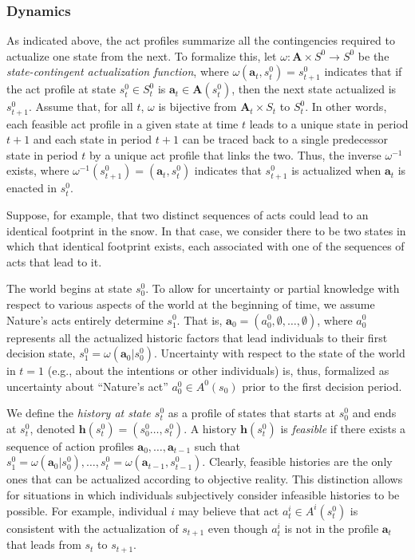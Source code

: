 \documentclass[
11pt,
titlepage,
reqno,
]{article}%
\theoremstyle{definition}
\begin{document}
	

	\subsubsection{Dynamics  } 
	  
	As indicated above, the act profiles summarize all the contingencies required to actualize one state from the next. 
	To formalize this, let $\omega:\mathbf{A}\times S^0\rightarrow S^0$ be the \textit{state-contingent actualization function}, where $\omega(\mathbf{a}_t,s^0_t)=s^0_{t+1}$ indicates that if the act profile at state $s^0_t\in S^0_t$ is $\mathbf{a}_t\in \mathbf{A}(s^0_t)$, then the next state actualized is $s^0_{t+1}$.
	Assume that, for all $t$, $\omega$ is bijective from $\mathbf{A}_t\times S_t$ to $S^0_t$.
	In other words, each feasible  act profile in a given state at time $t$ leads to a unique state in period $t+1$ and each state in period $t+1$ can be traced back to a single predecessor state in period $t$ by a unique act profile that links the two.
	Thus, the inverse $\omega^{-1}$ exists, where $\omega^{-1}(s^0_{t+1})=(\mathbf{a}_t,s^0_t)$ indicates that $s^0_{t+1}$ is actualized when $\mathbf{a}_t$ is enacted in $s^0_t$.

	Suppose, for example, that two distinct sequences of acts could lead to an identical footprint in the snow.
	In that case, we consider there to be two states in which that identical footprint exists, each associated with one of the sequences of acts that lead to it. 

	The world begins at state $s_0^0$.
	To allow for uncertainty or partial knowledge with respect to various aspects of the world at the beginning of time, we assume Nature's acts entirely determine $s^0_{1}$. 
	That is, $\mathbf{a}_0=(a^0_0,\emptyset,\ldots,\emptyset)$, where $a^0_0$ represents all the actualized historic factors that lead individuals to their  first decision state, $s^0_1=\omega(\mathbf{a}_0|s^0_0)$.
	Uncertainty with respect to the state of the world in $t=1$ (e.g., about the intentions or other individuals) is, thus, formalized as uncertainty about ``Nature's act'' $a^0_0\in A^0(s_0)$ prior to the first decision period.
	
	We define the \textit{history at state $s^0_t$} as a profile of states that starts at $s^0_0$ and ends at $s^0_t$, denoted $\mathbf{h}(s^0_t)=(s^0_0\ldots,s^0_t)$.
	A history $\mathbf{h}(s^0_t)$ is \textit{feasible} if there exists a sequence of action profiles $\mathbf{a}_0,\ldots,\mathbf{a}_{t-1}$ such that $s^0_1=\omega(\mathbf{a}_0|s^0_0),\ldots, s^0_t=\omega(\mathbf{a}_{t-1},s^0_{t-1})$.
	Clearly, feasible histories are the only ones that can be actualized according to objective reality.
	This distinction allows for situations in which individuals subjectively consider infeasible histories to be possible. 
	For example, individual $i$ may believe that act $a^i_t\in A^i(s^0_t)$ is consistent with the actualization of $s_{t+1}$ even though $a^i_t$ is not in the profile $\mathbf{a}_t$ that leads from $s_t$ to $s_{t+1}$.
	
\end{document}

